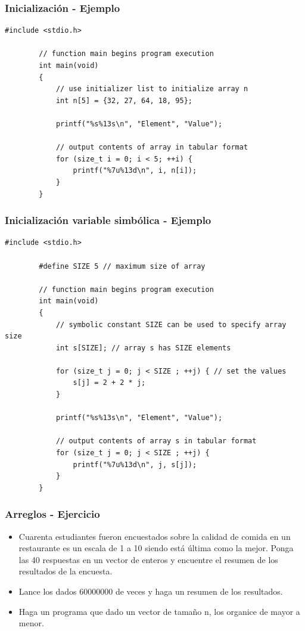 \documentclass[10.5pt,scale=1.0,t,aspectratio=169,hyperref={pdfpagelabels=false}]{beamer}
\begin{document}
\begin{frame}[fragile]
	\frametitle{Inicialización - Ejemplo} 
	\begin{lstlisting}[style=CStyle]
		#include <stdio.h>
		
		// function main begins program execution
		int main(void)
		{
			// use initializer list to initialize array n
			int n[5] = {32, 27, 64, 18, 95};
			
			printf("%s%13s\n", "Element", "Value");
			
			// output contents of array in tabular format
			for (size_t i = 0; i < 5; ++i) {
				printf("%7u%13d\n", i, n[i]);
			}
		}
	\end{lstlisting}
\end{frame}
\begin{frame}[fragile]
	\frametitle{Inicialización variable simbólica - Ejemplo} 
	\begin{lstlisting}[style=CStyle]
		#include <stdio.h>
		
		#define SIZE 5 // maximum size of array
		
		// function main begins program execution
		int main(void)
		{
			// symbolic constant SIZE can be used to specify array size
			int s[SIZE]; // array s has SIZE elements
			
			for (size_t j = 0; j < SIZE ; ++j) { // set the values
				s[j] = 2 + 2 * j;
			}
			
			printf("%s%13s\n", "Element", "Value");
			
			// output contents of array s in tabular format
			for (size_t j = 0; j < SIZE ; ++j) {
				printf("%7u%13d\n", j, s[j]);
			}
		}
	\end{lstlisting}
\end{frame}
\begin{frame}
	\frametitle{Arreglos - Ejercicio}
	\begin{itemize}
		\item 	Cuarenta estudiantes fueron encuestados sobre la calidad de comida en un restaurante es un escala de 1 a 10 siendo está última como la mejor. Ponga las 40 respuestas en un vector de enteros y encuentre el resumen de los resultados de la encuesta. 
		\item Lance los dados 60000000 de veces y haga un resumen de los resultados.  
		\item Haga un programa que dado un vector de tamaño n, los organice de mayor a menor. 
	\end{itemize} 
\end{frame}
\end{document}
